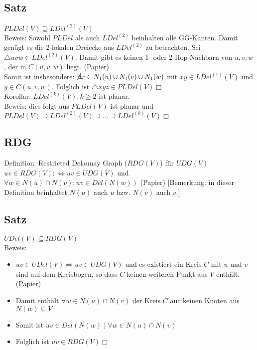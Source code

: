 \documentclass{article}
\begin{document}
\subsection*{Satz}
$PLDel(V) \supseteq LDel^{(2)}(V)$ \\
Beweis: Sowohl $PLDel$ als auch $LDel^{(2)}$ beinhalten alle GG-Kanten.
Damit genügt es die 2-lokalen Dreiecke aus $LDel^{(2)}$ zu betrachten.
Sei $\triangle uvw \in LDel^{(2)}(V)$. Damit gibt es keinen 1- oder
2-Hop-Nachbarn von $u,v,w$, der in $C(u,v,w)$ liegt. (Papier) \\
Somit ist insbesondere: $\cancel{\exists} x \in N_1(u) \cup N_1(v) \cup
N_1(w)$ mit $xy \in LDel^{(1)}(V)$ und $y \in C(u,v,w)$. Folglich ist
$\triangle xyz \in PLDel(V) \Box$ \\
Korollar: $LDel^{(k)}(V), k \geq 2$ ist planar. \\
Beweis: dies folgt aus $PLDel(V)$ ist planar und $PLDel(V) \supseteq
LDel^{(2)}(V) \supseteq \ldots \supseteq LDel^{(k)}(V) \Box$ 

\subsection*{RDG}
Definition: Restricted Delaunay Graph ($RDG(V)$) für $UDG(V)$ \\
$uv \in RDG(V) :\Leftrightarrow uv \in UDG(V)$ und $\forall w \in N(u)
\cap N(v): uv \in Del(N(w))$ (Papier) [Bemerkung: in dieser Definition
beinhaltet $N(u)$ auch $u$ bzw. $N(v)$ auch $v$.] \\

\subsection*{Satz}
$UDel(V) \subseteq RDG(V)$ \\
Beweis: \begin{itemize}
	\item $uv \in UDel(V) \Rightarrow uv \in UDG(V)$ und es existiert ein
	Kreis $C$ mit $u$ und $v$ sind auf dem Kreisbogen, so dass $C$ keinen
	weiteren Punkt aus $V$ enthält. (Papier)
	\item Damit enthält $\forall w \in N(u) \cap N(v)$ der Kreis $C$ auc
	keinen Knoten aus $N(w) \subseteq V$
	\item Somit ist $uv \in Del(N(w)) \forall w \in N(u) \cap N(v)$
	\item Folglich ist $uv \in RDG(V) \Box$
\end{itemize}
\end{document}
